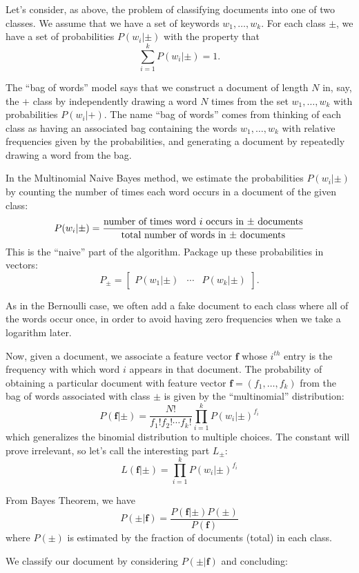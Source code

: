 \documentclass[
  oneside]{scrbook}
\renewcommand{\rm}{}
\begin{document}
Let's consider, as above, the problem of classifying documents into one
of two classes. We assume that we have a set of keywords
\(w_1,\ldots, w_k\). For each class \(\pm\), we have a set of
probabilities \(P(w_i|\pm)\) with the property that \[
\sum_{i=1}^{k}P(w_{i}|\pm)=1.
\]

The ``bag of words'' model says that we construct a document of length
\(N\) in, say, the \(+\) class by independently drawing a word \(N\)
times from the set \(w_1,\ldots, w_k\) with probabilities
\(P(w_{i}|+)\). The name ``bag of words'' comes from thinking of each
class as having an associated bag containing the words
\(w_1,\ldots, w_k\) with relative frequencies given by the
probabilities, and generating a document by repeatedly drawing a word
from the bag.

In the Multinomial Naive Bayes method, we estimate the probabilities
\(P(w_{i}|\pm)\) by counting the number of times each word occurs in a
document of the given class: \[
P(w_{i}|\pm) = \frac{\hbox{\rm number of times word $i$ occurs in $\pm$ documents}}{\hbox{\rm total number of words in $\pm$ documents}}
\] This is the ``naive'' part of the algorithm. Package up these
probabilities in vectors: \[
P_{\pm} = \left[\begin{array}{ccc} P(w_{1}|\pm) & \cdots & P(w_{k}|\pm)\end{array}\right].
\]

As in the Bernoulli case, we often add a fake document to each class
where all of the words occur once, in order to avoid having zero
frequencies when we take a logarithm later.

Now, given a document, we associate a feature vector \(\mathbf{f}\)
whose \(i^{th}\) entry is the frequency with which word \(i\) appears in
that document. The probability of obtaining a particular document with
feature vector \(\mathbf{f}=(f_1,\ldots, f_k)\) from the bag of words
associated with class \(\pm\) is given by the ``multinomial''
distribution: \[
P(\mathbf{f}|\pm)=\frac{N!}{f_1!f_2!\cdots f_k!} \prod_{i=1}^{k} P(w_{i}|\pm)^{f_{i}}
\] which generalizes the binomial distribution to multiple choices. The
constant will prove irrelevant, so let's call the interesting part
\(L_{\pm}\): \[
L(\mathbf{f}|\pm)= \prod_{i=1}^{k} P(w_{i}|\pm)^{f_{i}}
\]

From Bayes Theorem, we have \[
P(\pm|\mathbf{f}) = \frac{P(\mathbf{f}|\pm)P(\pm)}{P(\mathbf{f})}
\] where \(P(\pm)\) is estimated by the fraction of documents (total) in
each class.

We classify our document by considering \(P(\pm|\mathbf{f})\) and
concluding:
\end{document}
